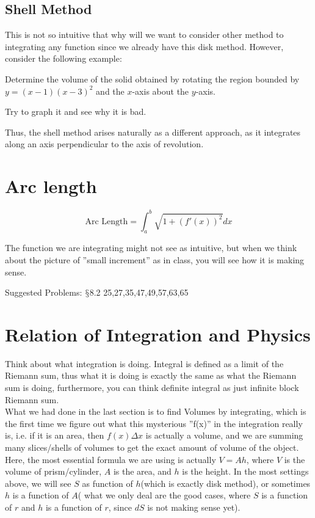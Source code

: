 \documentclass[12pt]{article}
\theoremstyle{definition}
\theoremstyle{definition}
\theoremstyle{remark}
\theoremstyle{definition}
\theoremstyle{definition}
\theoremstyle{definition}
\begin{document}
\subsection{Shell Method}

This is not so intuitive that why will we want to consider other method to integrating any function since we already have this disk method. However, consider the following example:

Determine the volume of the solid obtained by rotating the region bounded by $y=(x-1)(x-3)^2$ and the $x$-axis about the $y$-axis.

Try to graph it and see why it is bad.

Thus, the shell method arises naturally as a different approach, as it integrates along an axis perpendicular to the axis of revolution.

\section{Arc length}

\[\text{Arc Length}=\int^b_a\sqrt{1+(f'(x))^2}dx\]

The function we are integrating might not see as intuitive, but when we think about the picture of ''small increment'' as in class, you will see how it is making sense.

Suggested Problems: $\mathsection$8.2 25,27,35,47,49,57,63,65


\section{Relation of Integration and Physics}

Think about what integration is doing. Integral is defined as a limit of the Riemann sum, thus what it is doing is exactly the same as what the Riemann sum is doing, furthermore, you can think definite integral as just infinite block Riemann sum.\\
What we had done in the last section is to find Volumes by integrating, which is the first time we figure out what this mysterious ''f(x)'' in the integration really is, i.e. if it is an area, then $f(x)\Delta x$ is actually a volume, and we are summing many slices/shells of volumes to get the exact amount of volume of the object.\\
Here, the most essential formula we are using is actually $V=Ah$, where $V$ is the volume of prism/cylinder, $A$ is the area, and $h$ is the height. In the most settings above, we will see $S$ as function of $h$(which is exactly disk method), or sometimes $h$ is a function of $A$( what we only deal are the good cases, where $S$ is a function of $r$ and $h$ is a function of  $r$, since $dS$ is not making sense yet).
\end{document}
